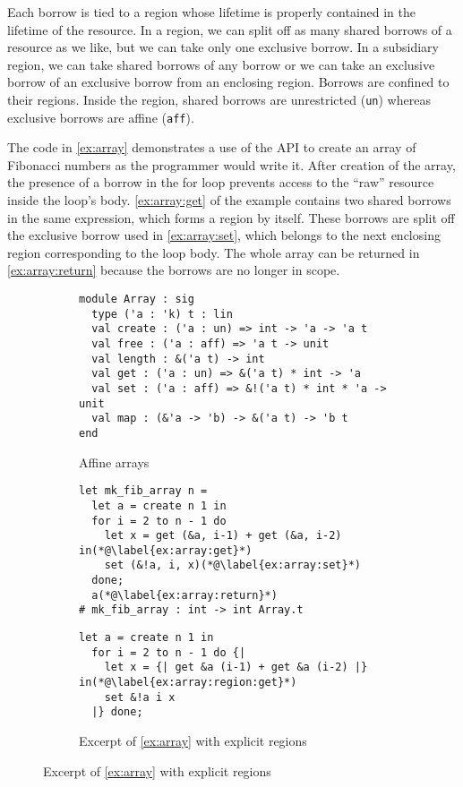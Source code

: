 Each borrow is tied to a region whose lifetime is properly
contained in the lifetime of the resource.
In a region, we can split off as many shared borrows of a resource as
we like, but we can take only one exclusive borrow. In a 
subsidiary region, we can take shared borrows of any
borrow or we can take an exclusive borrow of an exclusive borrow from an
enclosing region. Borrows are confined to their regions. Inside the region,
shared borrows are unrestricted (\lstinline/un/) whereas exclusive
borrows are affine (\lstinline/aff/).

The code in \cref{ex:array} demonstrates a use of the API to create an
array of Fibonacci numbers as the programmer would write it. After
creation of the array, the presence of a borrow in the for loop
prevents access to the ``raw'' resource inside the loop's
body. \cref{ex:array:get} of the example contains two shared borrows
in the same expression, which forms a region by itself. These borrows
are split off the exclusive borrow used in \cref{ex:array:set}, which
belongs to the next enclosing region corresponding to the loop body.
The whole array can be returned in \cref{ex:array:return} because  the
borrows are no longer in scope. 

\begin{figure}[tp]
  \centering
  \begin{subfigure}[t]{1\linewidth}
\begin{lstlisting}
module Array : sig
  type ('a : 'k) t : lin
  val create : ('a : un) => int -> 'a -> 'a t
  val free : ('a : aff) => 'a t -> unit
  val length : &('a t) -> int
  val get : ('a : un) => &('a t) * int -> 'a
  val set : ('a : aff) => &!('a t) * int * 'a -> unit
  val map : (&'a -> 'b) -> &('a t) -> 'b t
end
\end{lstlisting}
    \vspace{-15pt}
    \caption{Affine arrays}
    \label{sig:array}
  \end{subfigure}

  \begin{subfigure}[t]{1\linewidth}
\begin{lstlisting}
let mk_fib_array n =
  let a = create n 1 in
  for i = 2 to n - 1 do
    let x = get (&a, i-1) + get (&a, i-2) in(*@\label{ex:array:get}*)
    set (&!a, i, x)(*@\label{ex:array:set}*)
  done;
  a(*@\label{ex:array:return}*)
# mk_fib_array : int -> int Array.t
\end{lstlisting}
    \vspace{-10pt}
    \caption{Example of use of linear arrays}
    \label{ex:array}
\begin{lstlisting}[firstnumber=2]
  let a = create n 1 in
  for i = 2 to n - 1 do {|
    let x = {| get &a (i-1) + get &a (i-2) |} in(*@\label{ex:array:region:get}*)
    set &!a i x
  |} done;
\end{lstlisting}
    \vspace{-10pt}
    \caption{Excerpt of \cref{ex:array} with explicit regions}
    \label{ex:array:region}
  \end{subfigure}
\end{figure}


